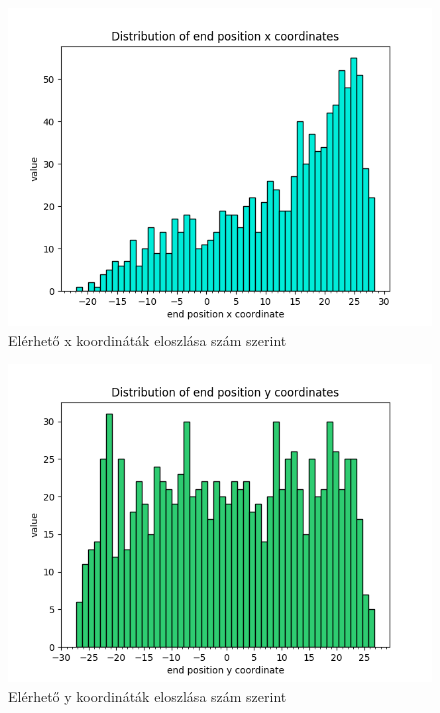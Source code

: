 \begin{figure}[h!]
\centering
\includegraphics[scale=0.75]{images/relative_x_endpos.png}
\caption{Elérhető x koordináták eloszlása szám szerint}
\label{fig:relative_x_endpos}
\end{figure}

 

\begin{figure}[h!]
\centering
\includegraphics[scale=0.75]{images/relative_y_endpos.png}
\caption{Elérhető y koordináták eloszlása szám szerint}
\label{fig:relative_y_endpos}
\end{figure}

